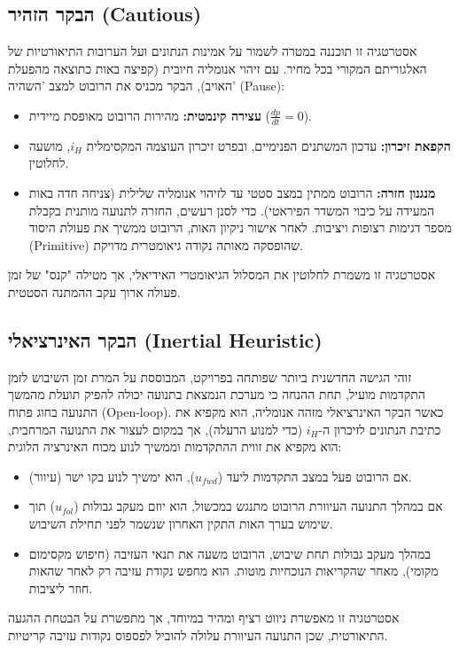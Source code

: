 \documentclass[12pt, a4paper]{article}
\begin{document}
\subsection{הבקר הזהיר (\textenglish{Cautious})}
אסטרטגיה זו תוכננה במטרה לשמור על אמינות הנתונים ועל הערובות התיאורטיות של האלגוריתם המקורי בכל מחיר. עם זיהוי אנומליה חיובית (קפיצה באות כתוצאה מהפעלת האויב), הבקר מכניס את הרובוט למצב 'השהיה' (\textenglish{Pause}):
\begin{itemize}
    \item \textbf{עצירה קינמטית:} מהירות הרובוט מאופסת מיידית ($\frac{dp}{dt} = 0$).
    \item \textbf{הקפאת זיכרון:} עדכון המשתנים הפנימיים, ובפרט זיכרון העוצמה המקסימלית $i_H$, מושעה לחלוטין.
    \item \textbf{מנגנון חזרה:} הרובוט ממתין במצב סטטי עד לזיהוי אנומליה שלילית (צניחה חדה באות המעידה על כיבוי המשדר הפיראטי). כדי לסנן רעשים, החזרה לתנועה מותנית בקבלת מספר דגימות רצופות ויציבות. לאחר אישור ניקיון האות, הרובוט ממשיך את פעולת היסוד (\textenglish{Primitive}) שהופסקה מאותה נקודה גיאומטרית מדויקת.
\end{itemize}
אסטרטגיה זו משמרת לחלוטין את המסלול הגיאומטרי האידיאלי, אך מטילה "קנס" של זמן פעולה ארוך עקב ההמתנה הסטטית.

\subsection{הבקר האינרציאלי (\textenglish{Inertial Heuristic})}
זוהי הגישה החדשנית ביותר שפותחה בפרויקט, המבוססת על המרת זמן השיבוש לזמן התקדמות מועיל, תחת ההנחה כי מערכת הנמצאת בתנועה יכולה להפיק תועלת מהמשך התנועה בחוג פתוח (\textenglish{Open-loop}).
כאשר הבקר האינרציאלי מזהה אנומליה, הוא מקפיא את כתיבת הנתונים לזיכרון ה-$i_H$ (כדי למנוע הרעלה), אך במקום לעצור את התנועה המרחבית, הוא מקפיא את זווית ההתקדמות וממשיך לנוע מכוח האינרציה הלוגית:
\begin{itemize}
    \item אם הרובוט פעל במצב התקדמות ליעד ($u_{fwd}$), הוא ימשיך לנוע בקו ישר (עיוור). 
    \item אם במהלך התנועה העיוורת הרובוט מתנגש במכשול, הוא יוזם מעקב גבולות ($u_{fol}$) תוך שימוש בערך האות התקין האחרון שנשמר לפני תחילת השיבוש.
    \item במהלך מעקב גבולות תחת שיבוש, הרובוט משעה את תנאי העזיבה (חיפוש מקסימום מקומי), מאחר שהקריאות הנוכחיות מוטות. הוא מחפש נקודת עזיבה רק לאחר שהאות חוזר ליציבות.
\end{itemize}
אסטרטגיה זו מאפשרת ניווט רציף ומהיר במיוחד, אך מתפשרת על הבטחת ההגעה התיאורטית, שכן התנועה העיוורת עלולה להוביל לפספוס נקודות עזיבה קריטיות.
\end{document}
